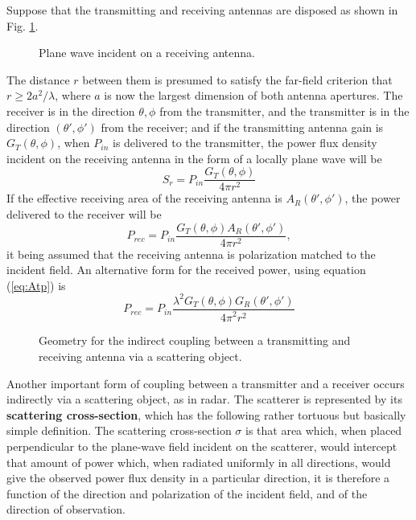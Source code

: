 Suppose that the transmitting and receiving antennas are disposed as shown in Fig. \ref{fig:coupling}.
\begin{figure}[htbp]
	\begin{center}
	\end{center}
	\caption{Plane wave incident on a receiving antenna.} 
	\label{fig:coupling}
\end{figure}
The distance $r$ between them is presumed to satisfy the far-field criterion that $r\geqslant2a^2/\lambda$, where $a$ is now the largest dimension of both antenna apertures. The receiver is in the direction $\theta,\phi$ from the transmitter, and the transmitter is in the direction $(\theta',\phi')$ from the receiver; and if the transmitting antenna gain is $G_T(\theta,\phi)$, when $P_{in}$ is delivered to the transmitter, the power flux density incident on the receiving antenna in the form of a locally plane wave will be
\begin{equation}
S_r=P_{in}\dfrac{G_T(\theta,\phi)}{4\pi r^2}
\end{equation}
If the effective receiving area of the receiving antenna is $A_R(\theta',\phi')$, the power delivered to the receiver will be
\begin{equation}
P_{rec}=P_{in}\dfrac{G_T(\theta,\phi)A_R(\theta',\phi')}{4\pi r^2},
\end{equation}
it being assumed that the receiving antenna is polarization matched to the incident field. An alternative form for the received power, using equation (\ref{eq:Atp}) is 
\begin{equation}
P_{rec}=P_{in}\dfrac{\lambda^2G_T(\theta,\phi)G_R(\theta',\phi')}{{4\pi}^2r^2}
\end{equation}

\begin{figure}[htbp]
	\begin{center}
	\end{center}
	\caption{Geometry for the indirect coupling between a transmitting and receiving antenna via a scattering object.} 
	\label{fig:scattering}
\end{figure}
Another important form of coupling between a transmitter and a receiver occurs indirectly via a scattering object, as in radar. The scatterer is represented by its \textbf{scattering cross-section}, which has the following rather tortuous but basically simple definition. The scattering cross-section $\sigma$ is that area which, when placed perpendicular to the plane-wave field incident on the scatterer, would intercept that amount of power which, when radiated uniformly in all directions, would give the observed power flux density in a particular direction, it is therefore a function of the direction and polarization of the incident field, and of the direction of observation.

